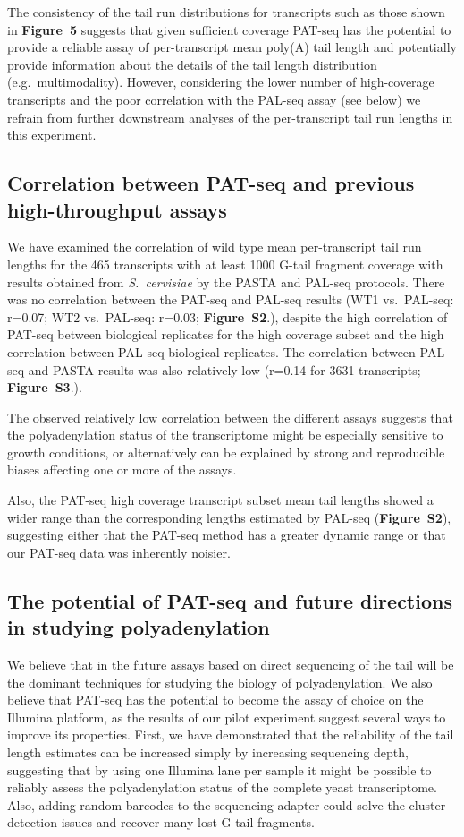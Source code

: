 \documentclass[10pt]{article}
\begin{document}
The consistency of the tail run distributions for transcripts such as those shown in \textbf{Figure~5} suggests that given sufficient coverage PAT-seq has the potential to provide a reliable assay of per-transcript mean poly(A) tail length and potentially provide information about the details of the tail length distribution (e.g.~multimodality). However, considering the lower number of high-coverage transcripts and the poor correlation with the PAL-seq assay (see below) we refrain from further downstream analyses of the per-transcript tail run lengths in this experiment.

\subsection*{Correlation between PAT-seq and previous high-throughput assays}

We have examined the correlation of wild type mean per-transcript tail run lengths for the 465 transcripts with at least 1000 G-tail fragment coverage with results obtained from \textit{S.~cervisiae} by the PASTA \cite{beilharz07} and PAL-seq \cite{subtelny14} protocols. There was no correlation between the PAT-seq and PAL-seq results (WT1 vs.\ PAL-seq: r=0.07; WT2 vs.\ PAL-seq: r=0.03; \textbf{Figure~S2}.), despite the high correlation of PAT-seq between biological replicates for the high coverage subset and the high correlation between PAL-seq biological replicates. The correlation between PAL-seq and PASTA results was also relatively low (r=0.14 for 3631 transcripts; \textbf{Figure~S3}.).

The observed relatively low correlation between the different assays suggests that the polyadenylation status of the transcriptome might be especially sensitive to growth conditions, or alternatively can be explained by strong and reproducible biases affecting one or more of the assays.

Also, the PAT-seq high coverage transcript subset mean tail lengths showed a wider range than the corresponding lengths estimated by PAL-seq (\textbf{Figure~S2}), suggesting either that the PAT-seq method has a greater dynamic range or that our PAT-seq data was inherently noisier.

\subsection*{The potential of PAT-seq and future directions in studying polyadenylation}

We believe that in the future assays based on direct sequencing of the tail will be the dominant techniques for studying the biology of polyadenylation. We also believe that  PAT-seq has the potential to become the assay of choice on the Illumina platform, as the results of our pilot experiment suggest several ways to improve its properties. First, we have demonstrated that the reliability of the tail length estimates can be increased simply by increasing sequencing depth, suggesting that by using one Illumina lane per sample it might be possible to reliably assess the polyadenylation status of the complete yeast transcriptome. Also, adding random barcodes to the sequencing adapter could solve the cluster detection issues and recover many lost G-tail fragments.
\end{document}
